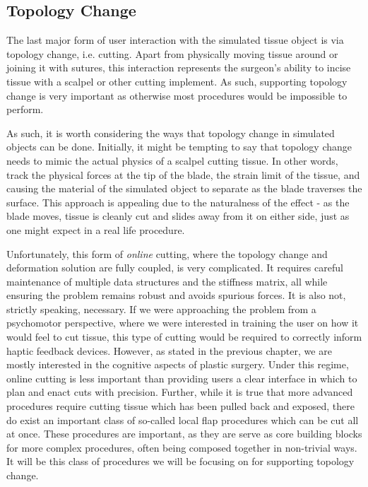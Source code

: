   \subsection{Topology Change}

  The last major form of user interaction with the simulated tissue
  object is via topology change, i.e. cutting. Apart from physically
  moving tissue around or joining it with sutures, this interaction
  represents the surgeon's ability to incise tissue with a scalpel or
  other cutting implement. As such, supporting topology change is very
  important as otherwise most procedures would be impossible to
  perform.

  As such, it is worth considering the ways that topology change in
  simulated objects can be done. Initially, it might be tempting to
  say that topology change needs to mimic the actual physics of a
  scalpel cutting tissue. In other words, track the physical forces at
  the tip of the blade, the strain limit of the tissue, and causing
  the material of the simulated object to separate as the blade
  traverses the surface. This approach is appealing due to the
  naturalness of the effect - as the blade moves, tissue is cleanly
  cut and slides away from it on either side, just as one might expect
  in a real life procedure.

  Unfortunately, this form of \textit{online} cutting, where the
  topology change and deformation solution are fully coupled, is very
  complicated. It requires careful maintenance of multiple data
  structures and the stiffness matrix, all while ensuring the problem
  remains robust and avoids spurious forces. It is also not, strictly
  speaking, necessary. If we were approaching the problem from a
  psychomotor perspective, where we were interested in training the
  user on how it would feel to cut tissue, this type of cutting would
  be required to correctly inform haptic feedback devices. However, as
  stated in the previous chapter, we are mostly interested in the
  cognitive aspects of plastic surgery. Under this regime, online
  cutting is less important than providing users a clear interface in
  which to plan and enact cuts with precision. Further, while it is
  true that more advanced procedures require cutting tissue which has
  been pulled back and exposed, there do exist an important class of
  so-called local flap procedures which can be cut all at once. These
  procedures are important, as they are serve as core building blocks
  for more complex procedures, often being composed together in
  non-trivial ways. It will be this class of procedures we will be
  focusing on for supporting topology change.

